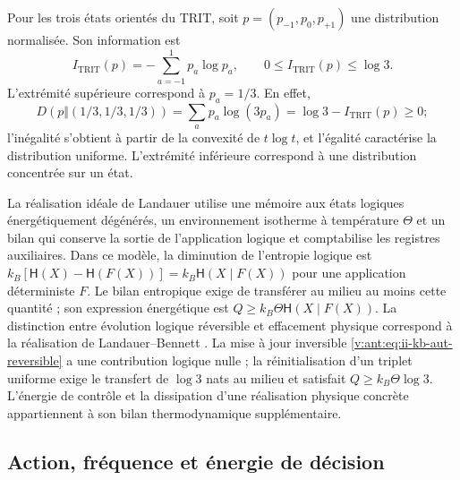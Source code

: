 Pour les trois états orientés du TRIT, soit
\(p=(p_{-1},p_0,p_{+1})\) une distribution normalisée. Son information est
\begin{equation}
 I_{\mathrm{TRIT}}(p)=-\sum_{a=-1}^{1}p_a\log p_a,
 \qquad 0\leq I_{\mathrm{TRIT}}(p)\leq\log3.
 \label{v:ant:eq:ii-kb-aut-trit}
\end{equation}
L'extrémité supérieure correspond à \(p_a=1/3\). En effet,
\[
 D(p\Vert(1/3,1/3,1/3))
 =\sum_ap_a\log(3p_a)=\log3-I_{\mathrm{TRIT}}(p)\geq0;
\]
l'inégalité s'obtient à partir de la convexité de \(t\log t\), et l'égalité caractérise la distribution uniforme. L'extrémité inférieure correspond à une distribution concentrée sur un état.

La réalisation idéale de Landauer utilise une mémoire aux états logiques
énergétiquement dégénérés, un environnement isotherme à température \(\Theta\)
et un bilan qui conserve la sortie de l'application logique et comptabilise les
registres auxiliaires. Dans ce modèle, la diminution de l'entropie logique est
\(k_B[\mathsf H(X)-\mathsf H(F(X))]
=k_B\mathsf H(X\mid F(X))\) pour une application déterministe \(F\).
Le bilan entropique exige de transférer au milieu au moins cette quantité ;
son expression énergétique est \(Q\geq k_B\Theta\mathsf H(X\mid F(X))\).
La distinction entre évolution logique réversible et effacement physique
correspond à la réalisation de Landauer--Bennett \cite{bennett2003}.
La mise à jour inversible
\eqref{v:ant:eq:ii-kb-aut-reversible} a une contribution logique nulle ; la
réinitialisation d'un triplet uniforme exige le transfert de \(\log3\) nats
au milieu et satisfait \(Q\geq k_B\Theta\log3\).
L'énergie de contrôle et la dissipation d'une réalisation physique
concrète appartiennent à son bilan thermodynamique supplémentaire.

\subsection{Action, fréquence et énergie de décision}

